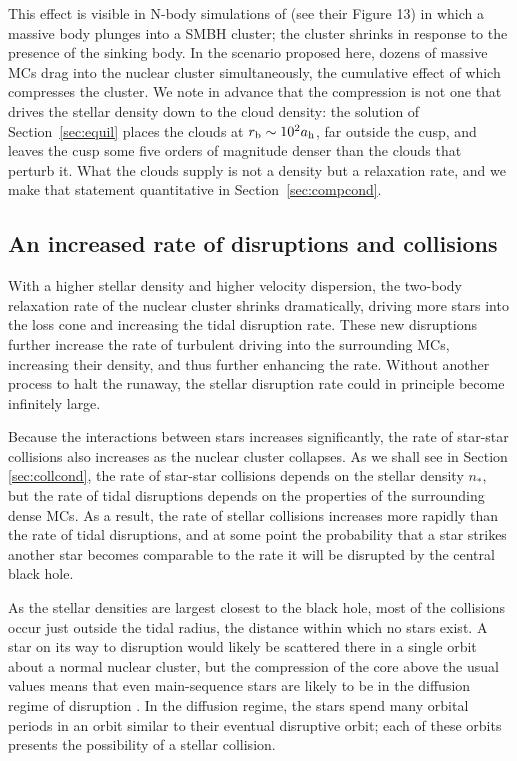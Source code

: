 \documentclass[preprint2]{aastex}
\begin{document}
This effect is visible in N-body simulations of \citet{Antonini:2012a} (see their Figure 13) in which a massive body plunges into a SMBH cluster; the cluster shrinks in response to the presence of the sinking body. In the scenario proposed here, dozens of massive MCs drag into the nuclear cluster simultaneously, the cumulative effect of which compresses the cluster. We note in advance that the compression is not one that drives the stellar density down to the cloud density: the solution of Section~\ref{sec:equil} places the clouds at $r_{\rm b} \sim 10^{2} a_{\rm h}$, far outside the cusp, and leaves the cusp some five orders of magnitude denser than the clouds that perturb it. What the clouds supply is not a density but a relaxation rate, and we make that statement quantitative in Section~\ref{sec:compcond}.

\subsection{An increased rate of disruptions and collisions}\label{subsec:increase}

With a higher stellar density and higher velocity dispersion, the two-body relaxation rate of the nuclear cluster shrinks dramatically, driving more stars into the loss cone and increasing the tidal disruption rate. These new disruptions further increase the rate of turbulent driving into the surrounding MCs, increasing their density, and thus further enhancing the rate. Without another process to halt the runaway, the stellar disruption rate could in principle become infinitely large.

Because the interactions between stars increases significantly, the rate of star-star collisions also increases as the nuclear cluster collapses. As we shall see in Section \ref{sec:collcond}, the rate of star-star collisions depends on the stellar density $n_{\ast}$, but the rate of tidal disruptions depends on the properties of the surrounding dense MCs. As a result, the rate of stellar collisions increases more rapidly than the rate of tidal disruptions, and at some point the probability that a star strikes another star becomes comparable to the rate it will be disrupted by the central black hole. 

As the stellar densities are largest closest to the black hole, most of the collisions occur just outside the tidal radius, the distance within which no stars exist. A star on its way to disruption would likely be scattered there in a single orbit about a normal nuclear cluster, but the compression of the core above the usual values means that even main-sequence stars are likely to be in the diffusion regime of disruption \citep{Wang:2004a,MacLeod:2012a}. In the diffusion regime, the stars spend many orbital periods in an orbit similar to their eventual disruptive orbit; each of these orbits presents the possibility of a stellar collision.
\end{document}
